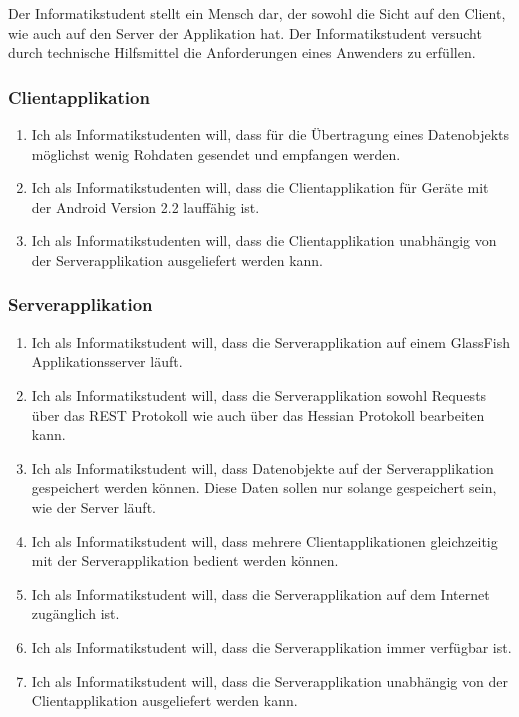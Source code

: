\documentclass[listof=totocnumbered, bibliography=totocnumbered]{scrreprt}
\begin{document}
  Der Informatikstudent stellt ein Mensch dar, der sowohl die Sicht auf den
  Client, wie auch auf den Server der Applikation hat. Der Informatikstudent
  versucht durch technische Hilfsmittel die Anforderungen eines Anwenders zu
  erfüllen.
  
  \subsubsection{Clientapplikation}
  
  \begin{enumerate}
    \setcounter{enumi}{\value{userStoriesZaehler}}
    \item Ich als Informatikstudenten will, dass für die Übertragung eines
    Datenobjekts möglichst wenig Rohdaten gesendet und empfangen werden.
    \item Ich als Informatikstudenten will, dass die Clientapplikation für
    Geräte mit der Android Version 2.2 lauffähig ist.
    \item Ich als Informatikstudenten will, dass die Clientapplikation
    unabhängig von der Serverapplikation ausgeliefert werden kann.
    \setcounter{userStoriesZaehler}{\value{enumi}}
  \end{enumerate}
  
  \subsubsection{Serverapplikation}
  
  \begin{enumerate}
    \setcounter{enumi}{\value{userStoriesZaehler}}
    \item Ich als Informatikstudent will, dass die Serverapplikation auf einem
    GlassFish Applikationsserver läuft.
    \item Ich als Informatikstudent will, dass die Serverapplikation sowohl
    Requests über das \ac{REST} Protokoll wie auch über das Hessian
    Protokoll bearbeiten kann.
    \item Ich als Informatikstudent will, dass Datenobjekte auf der
    Serverapplikation gespeichert werden können. Diese Daten sollen nur solange
    gespeichert sein, wie der Server läuft.
    \item Ich als Informatikstudent will, dass mehrere Clientapplikationen
    gleichzeitig mit der Serverapplikation bedient werden können.
    \item Ich als Informatikstudent will, dass die Serverapplikation
    auf dem Internet zugänglich ist.
    \item Ich als Informatikstudent will, dass die Serverapplikation immer
    verfügbar ist.
    \item Ich als Informatikstudent will, dass die Serverapplikation
    unabhängig von der Clientapplikation ausgeliefert werden kann.
    \setcounter{userStoriesZaehler}{\value{enumi}}
  \end{enumerate}
  
\end{document}
